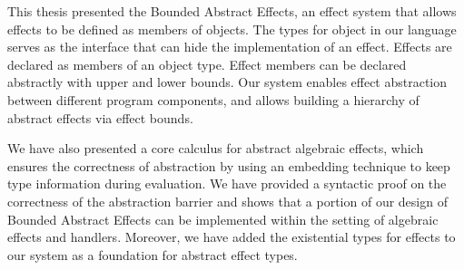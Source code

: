 This thesis presented the Bounded Abstract Effects, an effect system that allows effects to be defined as members of objects. The types for object in our language serves as the interface that can hide the implementation of an effect. Effects are declared as members of an object type. Effect members can be declared abstractly with upper and lower bounds. Our system enables effect abstraction between different program components, and allows building a hierarchy of abstract effects via effect bounds.

We have also presented a core calculus for abstract algebraic effects, which ensures the correctness of abstraction by using an embedding technique to keep type information during evaluation. We have provided a syntactic proof on the correctness of the abstraction barrier and shows that a portion of our design of Bounded Abstract Effects can be implemented within the setting of algebraic effects and handlers.  Moreover, we have added the existential types for effects to our system as a foundation for abstract effect types. 






